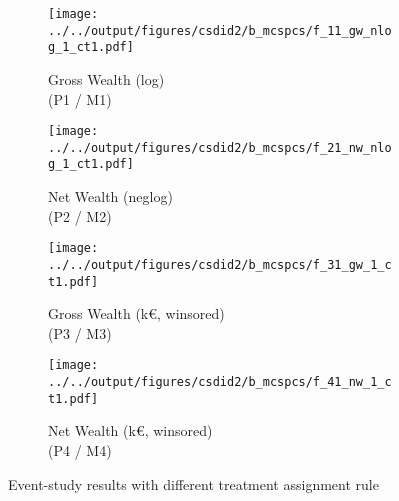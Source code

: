 \begin{figure}[ht!]
    \centering
    \begin{subfigure}{0.45\textwidth}
        \caption{Gross Wealth (log)\\(P1 / M1)}
        \texttt{[image: ../../output/figures/csdid2/b\_mcspcs/f\_11\_gw\_nlog\_1\_ct1.pdf]}
        \label{sfig:did_gw_nlog1ct1}
    \end{subfigure}
    \begin{subfigure}{0.45\textwidth}
        \caption{Net Wealth (neglog)\\(P2 / M2)}
        \texttt{[image: ../../output/figures/csdid2/b\_mcspcs/f\_21\_nw\_nlog\_1\_ct1.pdf]}
        \label{sfig:did_nw_nlog1ct1}
    \end{subfigure}
    \begin{subfigure}{0.45\textwidth}
        \caption{Gross Wealth (k€, winsored)\\(P3 / M3)}
        \texttt{[image: ../../output/figures/csdid2/b\_mcspcs/f\_31\_gw\_1\_ct1.pdf]}
        \label{sfig:did_gw1ct1}
    \end{subfigure}
    \begin{subfigure}{0.45\textwidth}
        \caption{Net Wealth (k€, winsored)\\(P4 / M4)}
        \texttt{[image: ../../output/figures/csdid2/b\_mcspcs/f\_41\_nw\_1\_ct1.pdf]}
        \label{sfig:did_nw1ct1}
    \end{subfigure}
    \caption{Event-study results with different treatment assignment rule}
    \label{fig:diff_treat_rule}
\end{figure}







